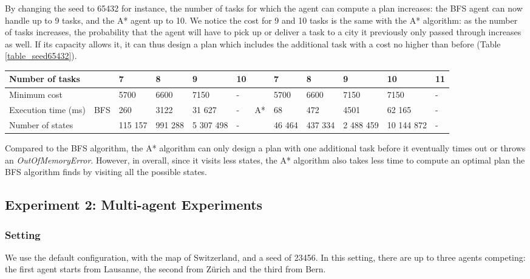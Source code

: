 \documentclass[10pt]{article}
\begin{document}
\noindent
By changing the seed to 65432 for instance, the number of tasks for which the agent can compute a plan increases: the BFS agent can now handle up to 9 tasks, and the A* agent up to 10. We notice the cost for 9 and 10 tasks is the same with the A* algorithm: as the number of tasks increases, the probability that the agent will have to pick up or deliver a task to a city it previously only passed through increases as well. If its capacity allows it, it can thus design a plan which includes the additional task with a cost no higher than before (Table \ref{table_seed65432}).\\
\begin{adjustwidth}{0cm}{}
\begin{tabular}{|l|lllll|llllll|}
\hline
Number of tasks & & 7 & 8 & 9 & 10 & & 7 & 8 & 9 & 10 & 11\\
\hline
Minimum cost & & 5700 & 6600 & 7150 & - & & 5700 & 6600 & 7150 & 7150 & -\\
Execution time (ms) & BFS & 260 & 3122 & 31 627 & - & A* & 68 & 472 & 4501 & 62 165 & -\\
Number of states & & 115 157 & 991 288 & 5 307 498 & - & & 46 464 & 437 334 & 2 488 459 & 10 144 872 & -\\
\hline
\end{tabular}
\label{table_seed65432}
\end{adjustwidth}
\vspace{4mm}

\noindent
Compared to the BFS algorithm, the A* algorithm can only design a plan with one additional task before it eventually times out or throws an \textit{OutOfMemoryError}.
However, in overall, since it visits less states, the A* algorithm also takes less time to compute an optimal plan the BFS algorithm finds by visiting all the possible states.

\subsection{Experiment 2: Multi-agent Experiments}

\subsubsection{Setting}
We use the default configuration, with the map of Switzerland, and a seed of 23456. In this setting, there are up to three agents competing: the first agent starts from Lausanne, the second from Z\"urich and the third from Bern.
\end{document}

